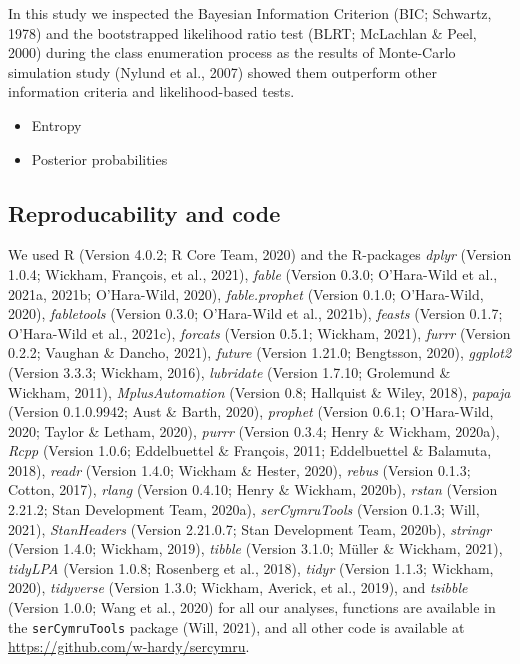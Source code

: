 \documentclass[
  english,
  man,floatsintext]{apa7}
\providecommand{\tightlist}{%
  \setlength{\itemsep}{0pt}\setlength{\parskip}{0pt}}
\begin{document}
In this study we inspected the Bayesian Information Criterion (BIC; Schwartz, 1978) and the bootstrapped likelihood ratio test (BLRT; McLachlan \& Peel, 2000) during the class enumeration process as the results of Monte-Carlo simulation study (Nylund et al., 2007) showed them outperform other information criteria and likelihood-based tests.

\begin{itemize}
\tightlist
\item
  Entropy
\item
  Posterior probabilities
\end{itemize}

\hypertarget{reproducability-and-code}{%
\subsection{Reproducability and code}\label{reproducability-and-code}}

We used R (Version 4.0.2; R Core Team, 2020) and the R-packages \emph{dplyr} (Version 1.0.4; Wickham, François, et al., 2021), \emph{fable} (Version 0.3.0; O'Hara-Wild et al., 2021a, 2021b; O'Hara-Wild, 2020), \emph{fable.prophet} (Version 0.1.0; O'Hara-Wild, 2020), \emph{fabletools} (Version 0.3.0; O'Hara-Wild et al., 2021b), \emph{feasts} (Version 0.1.7; O'Hara-Wild et al., 2021c), \emph{forcats} (Version 0.5.1; Wickham, 2021), \emph{furrr} (Version 0.2.2; Vaughan \& Dancho, 2021), \emph{future} (Version 1.21.0; Bengtsson, 2020), \emph{ggplot2} (Version 3.3.3; Wickham, 2016), \emph{lubridate} (Version 1.7.10; Grolemund \& Wickham, 2011), \emph{MplusAutomation} (Version 0.8; Hallquist \& Wiley, 2018), \emph{papaja} (Version 0.1.0.9942; Aust \& Barth, 2020), \emph{prophet} (Version 0.6.1; O'Hara-Wild, 2020; Taylor \& Letham, 2020), \emph{purrr} (Version 0.3.4; Henry \& Wickham, 2020a), \emph{Rcpp} (Version 1.0.6; Eddelbuettel \& François, 2011; Eddelbuettel \& Balamuta, 2018), \emph{readr} (Version 1.4.0; Wickham \& Hester, 2020), \emph{rebus} (Version 0.1.3; Cotton, 2017), \emph{rlang} (Version 0.4.10; Henry \& Wickham, 2020b), \emph{rstan} (Version 2.21.2; Stan Development Team, 2020a), \emph{serCymruTools} (Version 0.1.3; Will, 2021), \emph{StanHeaders} (Version 2.21.0.7; Stan Development Team, 2020b), \emph{stringr} (Version 1.4.0; Wickham, 2019), \emph{tibble} (Version 3.1.0; Müller \& Wickham, 2021), \emph{tidyLPA} (Version 1.0.8; Rosenberg et al., 2018), \emph{tidyr} (Version 1.1.3; Wickham, 2020), \emph{tidyverse} (Version 1.3.0; Wickham, Averick, et al., 2019), and \emph{tsibble} (Version 1.0.0; Wang et al., 2020) for all our analyses, functions are available in the \texttt{serCymruTools} package (Will, 2021), and all other code is available at \url{https://github.com/w-hardy/sercymru}.
\end{document}
